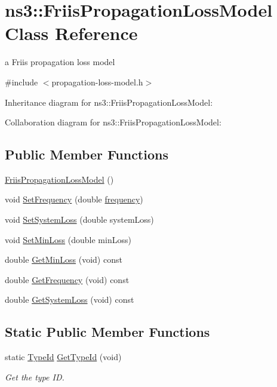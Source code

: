 \hypertarget{classns3_1_1FriisPropagationLossModel}{}\section{ns3\+:\+:Friis\+Propagation\+Loss\+Model Class Reference}
\label{classns3_1_1FriisPropagationLossModel}


a Friis propagation loss model  




{\ttfamily \#include $<$propagation-\/loss-\/model.\+h$>$}



Inheritance diagram for ns3\+:\+:Friis\+Propagation\+Loss\+Model\+:


Collaboration diagram for ns3\+:\+:Friis\+Propagation\+Loss\+Model\+:
\subsection*{Public Member Functions}
\begin{DoxyCompactItemize}
\item 
\hyperlink{classns3_1_1FriisPropagationLossModel_acbc7dfc774fe6cc07f6a72526f31c3d6}{Friis\+Propagation\+Loss\+Model} ()
\item 
void \hyperlink{classns3_1_1FriisPropagationLossModel_a6baac266c391cd9d074341e3f8b8e183}{Set\+Frequency} (double \hyperlink{mmwave_2model_2fading-traces_2fading__trace__generator_8m_a09045328d6d7e16aa4013f526cc6993d}{frequency})
\item 
void \hyperlink{classns3_1_1FriisPropagationLossModel_a6a57a0ac403b426e5ef4e432cffd1501}{Set\+System\+Loss} (double system\+Loss)
\item 
void \hyperlink{classns3_1_1FriisPropagationLossModel_accf6f11a8cb14e6dff686b599c7d1d24}{Set\+Min\+Loss} (double min\+Loss)
\item 
double \hyperlink{classns3_1_1FriisPropagationLossModel_a818dac300f6ac2024457b95647ac0015}{Get\+Min\+Loss} (void) const 
\item 
double \hyperlink{classns3_1_1FriisPropagationLossModel_ac24757b6c9e436c8233fea4bfd010c25}{Get\+Frequency} (void) const 
\item 
double \hyperlink{classns3_1_1FriisPropagationLossModel_ac7fd35502e69bcc9ba1cd4028d30b186}{Get\+System\+Loss} (void) const 
\end{DoxyCompactItemize}
\subsection*{Static Public Member Functions}
\begin{DoxyCompactItemize}
\item 
static \hyperlink{classns3_1_1TypeId}{Type\+Id} \hyperlink{classns3_1_1FriisPropagationLossModel_a80af82c5a7d24e10181838b15a755351}{Get\+Type\+Id} (void)
\begin{DoxyCompactList}\small\item\em Get the type ID. \end{DoxyCompactList}\end{DoxyCompactItemize}
